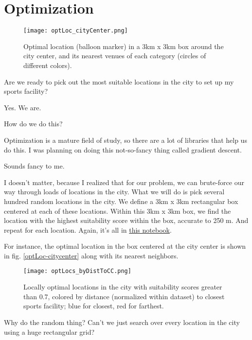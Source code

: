 \chapter{Optimization}\label{chap:optimization}

\begin{figure}[h!]
	\centering
	\texttt{[image: optLoc\_cityCenter.png]}
	\caption{Optimal location (balloon marker) in a 3km x 3km box around the city center, and its nearest venues of each category (circles of different colors). \label{fig:optLoc-citycenter}}
\end{figure}

{\color{blue} Are we ready to pick out the most suitable locations in the city to set up my sports facility?}

Yes. We are. 

{\color{blue} How do we do this?}

Optimization is a mature field of study, so there are a lot of libraries that help us do this. I was planning on doing this not-so-fancy thing called gradient descent.

{\color{blue} Sounds fancy to me.}

I doesn't matter, because I realized that for our problem, we can brute-force our way through loads of locations in the city. What we will do is pick several hundred random locations in the city. We define a 3km x 3km rectangular box centered at each of these locations. Within this 3km x 3km box, we find the location with the highest suitability score within the box, accurate to 250 m. And repeat for each location. Again, it's all in \href{https://github.com/saba-vadarevu/IBM-dataScience-Capstone/blob/master/final/optimization.ipynb}{this notebook}.

For instance, the optimal location in the box centered at the city center is shown in fig. \ref{optLoc-citycenter} along with its nearest neighbors. 

\begin{figure}[h!]
	\centering
	\texttt{[image: optLocs\_byDistToCC.png]}
	\caption{Locally optimal locations in the city with suitability scores greater than 0.7, colored by distance (normalized within dataset) to closest sports facility; blue for closest, red for farthest. \label{fig:optLocs-all}}
\end{figure}


{\color{blue} Why do the random thing? Can't we just search over every location in the city using a huge rectangular grid? }

